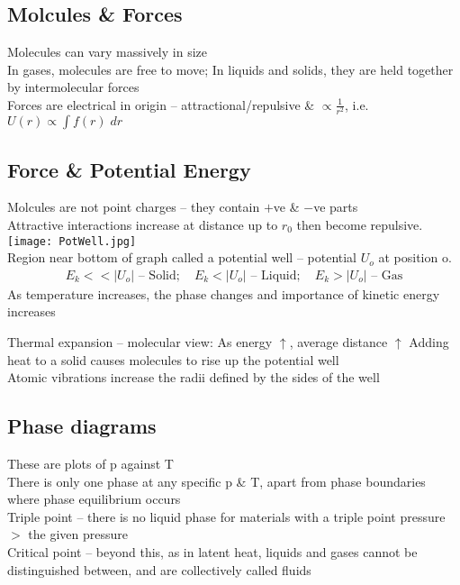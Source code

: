 \documentclass[a4paper, 11pt, fleqn, normalem]{report}
\begin{document}
\section*{Molcules \& Forces}
Molecules can vary massively in size \\
In gases, molecules are free to move; In liquids and solids, they are held together by intermolecular forces \\
Forces are electrical in origin -- attractional/repulsive \& $\propto \frac{1}{r^{2}}$, i.e. $U(r)\propto\int\! f(r)\; dr$

\section*{Force \& Potential Energy}
Molcules are not point charges -- they contain $+$ve \& $-$ve parts \\
Attractive interactions increase at distance up to $r_{0}$ then become repulsive. \\
\texttt{[image: PotWell.jpg]} \\
Region near bottom of graph called a potential well -- potential $U_{o}$ at position o.
\begin{align*}
	E_{k} << |U_{o}| \text{ -- Solid};\quad
	E_{k} < |U_{o}| \text{ -- Liquid};\quad
	E_{k} > |U_{o}| \text{ -- Gas}
\end{align*}
As temperature increases, the phase changes and importance of kinetic energy increases

Thermal expansion -- molecular view:
As energy $\uparrow$, average distance $\uparrow$
Adding heat to a solid causes molecules to rise up the potential well \\
Atomic vibrations increase the radii defined by the sides of the well

\section*{Phase diagrams}
These are plots of p against T \\
There is only one phase at any specific p \& T, apart from phase boundaries where phase equilibrium occurs \\
Triple point -- there is no liquid phase for materials with a triple point pressure $>$ the given pressure \\
Critical point -- beyond this, as in latent heat, liquids and gases cannot be distinguished between, and are collectively called fluids

\chapter{}
\end{document}
